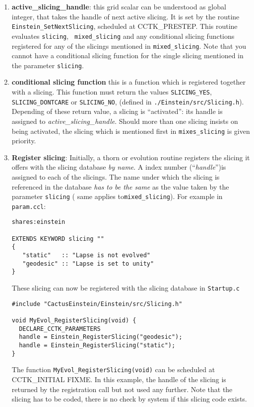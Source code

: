 \begin{enumerate}
\item{\bf active\_slicing\_handle}: this grid scalar can be understood
as global integer, that takes the handle of next active slicing. It is 
set by the routine {\tt  Einstein\_SetNextSlicing}, scheduled at
CCTK\_PRESTEP. This routine evaluates {\tt slicing}, {\tt
mixed\_slicing} and any conditional slicing functions registered
for any of the slicings mentioned in  {\tt mixed\_slicing}. Note that
you cannot have a conditional slicing function for the single slicing mentioned 
in the parameter {\tt slicing}.

\item{\bf conditional slicing function} this is a function which is
registered together with a slicing. This function must return the values
{\tt SLICING\_YES}, {\tt SLICING\_DONTCARE} or {\tt SLICING\_NO}, (defined
in {\tt ./Einstein/src/Slicing.h}). Depending of these return value, a 
slicing is ``activated'': its handle is assigned to {\em
active\_slicing\_handle}. Should more than one slicing insists on being
activated, the slicing which is mentioned first in {\tt mixes\_slicing} 
is given priority.

\item{\bf Register slicing}: Initially, a thorn or evolution routine
registers the slicing it offers with the slicing database {\em by name}.
A index number (``{\em handle}'')is assigned to each of the
slicings. The name under which the slicing is referenced in the
database {\em has to be the same} as the value taken by the parameter
{\tt slicing} ( same applies to{\tt mixed\_slicing}). For example in {\tt param.ccl}: 
\begin{verbatim}
shares:einstein

EXTENDS KEYWORD slicing ""
{
   "static"   :: "Lapse is not evolved"
   "geodesic" :: "Lapse is set to unity"
}
\end{verbatim}
These slicing can now be registered with the slicing database in {\tt Startup.c}

\begin{verbatim}
#include "CactusEinstein/Einstein/src/Slicing.h"

void MyEvol_RegisterSlicing(void) {
  DECLARE_CCTK_PARAMETERS
  handle = Einstein_RegisterSlicing("geodesic");
  handle = Einstein_RegisterSlicing("static");
}
\end{verbatim}
The function {\tt MyEvol\_RegisterSlicing(void)} can be scheduled at CCTK\_INITIAL
FIXME. In this example,  the handle of the slicing is returned by the
registration call but
not used any further. Note that the slicing has to be coded, there is
no check by system if this slicing code exists.


\end{enumerate}
